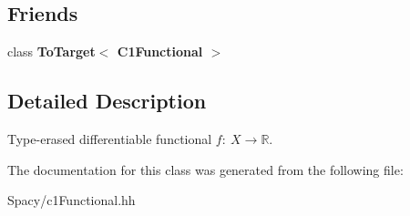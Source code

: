 \subsection*{Friends}
\begin{DoxyCompactItemize}
\item 
\hypertarget{classSpacy_1_1C1Functional_a72293a8ac99004002a0c43398b9ebcbc}{}class {\bfseries To\+Target$<$ C1\+Functional $>$}\label{classSpacy_1_1C1Functional_a72293a8ac99004002a0c43398b9ebcbc}

\end{DoxyCompactItemize}


\subsection{Detailed Description}
Type-\/erased differentiable functional $f:\ X \to \mathbb{R} $. 

The documentation for this class was generated from the following file\+:\begin{DoxyCompactItemize}
\item 
Spacy/c1\+Functional.\+hh\end{DoxyCompactItemize}
